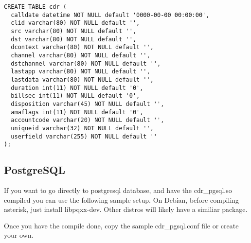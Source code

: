 \begin{astlisting}
\begin{verbatim}
CREATE TABLE cdr (
  calldate datetime NOT NULL default '0000-00-00 00:00:00',
  clid varchar(80) NOT NULL default '',
  src varchar(80) NOT NULL default '',
  dst varchar(80) NOT NULL default '',
  dcontext varchar(80) NOT NULL default '',
  channel varchar(80) NOT NULL default '',
  dstchannel varchar(80) NOT NULL default '',
  lastapp varchar(80) NOT NULL default '',
  lastdata varchar(80) NOT NULL default '',
  duration int(11) NOT NULL default '0',
  billsec int(11) NOT NULL default '0',
  disposition varchar(45) NOT NULL default '',
  amaflags int(11) NOT NULL default '0',
  accountcode varchar(20) NOT NULL default '',
  uniqueid varchar(32) NOT NULL default '',
  userfield varchar(255) NOT NULL default ''
);
\end{verbatim}
\end{astlisting}


\subsection{PostgreSQL}
        If you want to go directly to postgresql database, and have the cdr_pgsql.so
        compiled you can use the following sample setup.
        On Debian, before compiling asterisk, just install libpqxx-dev.
        Other distros will likely have a similiar package.

        Once you have the compile done,
        copy the sample cdr_pgsql.conf file or create your own.

